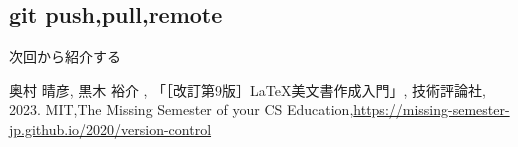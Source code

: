 \documentclass{article}
\begin{document}
\subsection{git push,pull,remote}
次回から紹介する
\begin{thebibliography}{999}
	  奥村 晴彦,  黒木 裕介 , 「［改訂第9版］LaTeX美文書作成入門」, 技術評論社, 2023.
	 MIT,The Missing Semester of your CS Education,\newline \url{https://missing-semester-jp.github.io/2020/version-control} 
\end{thebibliography}
\end{document}

